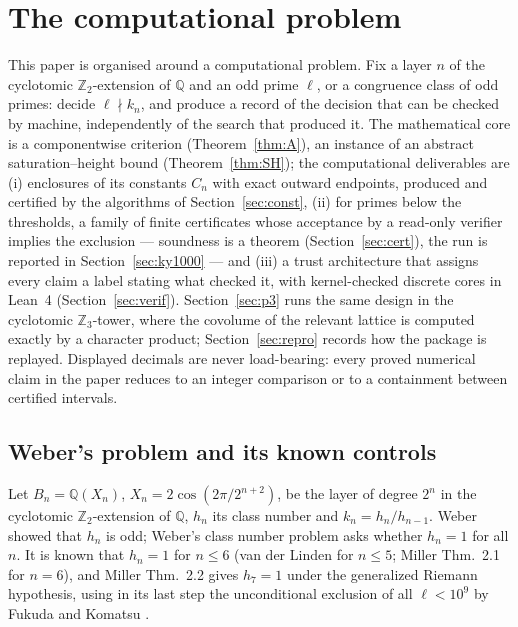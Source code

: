 \documentclass[11pt]{amsart}
\theoremstyle{remark}\newtheorem{remark}[theorem]{Remark}
\theoremstyle{definition}\newtheorem{definition}[theorem]{Definition}
\theoremstyle{definition}\newtheorem{algorithm}[theorem]{Algorithm}
\newcommand{\Q}{\mathbb{Q}}\newcommand{\Z}{\mathbb{Z}}\newcommand{\R}{\mathbb{R}}\newcommand{\F}{\mathbb{F}}
\begin{document}
\section{The computational problem}\label{sec:intro}
This paper is organised around a computational problem. Fix a layer $n$ of the cyclotomic $\Z_2$-extension of $\Q$ and an odd prime $\ell$, or a congruence class of odd primes: decide $\ell\nmid k_n$, and produce a record of the decision that can be checked by machine, independently of the search that produced it. The mathematical core is a componentwise criterion (Theorem~\ref{thm:A}), an instance of an abstract saturation--height bound (Theorem~\ref{thm:SH}); the computational deliverables are (i) enclosures of its constants $C_n$ with exact outward endpoints, produced and certified by the algorithms of Section~\ref{sec:const}, (ii) for primes below the thresholds, a family of finite certificates whose acceptance by a read-only verifier implies the exclusion --- soundness is a theorem (Section~\ref{sec:cert}), the run is reported in Section~\ref{sec:ky1000} --- and (iii) a trust architecture that assigns every claim a label stating what checked it, with kernel-checked discrete cores in Lean~4 (Section~\ref{sec:verif}). Section~\ref{sec:p3} runs the same design in the cyclotomic $\Z_3$-tower, where the covolume of the relevant lattice is computed exactly by a character product; Section~\ref{sec:repro} records how the package is replayed. Displayed decimals are never load-bearing: every proved numerical claim in the paper reduces to an integer comparison or to a containment between certified intervals.
\subsection{Weber's problem and its known controls}
Let $B_n=\Q(X_n)$, $X_n=2\cos(2\pi/2^{n+2})$, be the layer of degree $2^n$ in the cyclotomic $\Z_2$-extension of $\Q$, $h_n$ its class number and $k_n=h_n/h_{n-1}$. Weber showed that $h_n$ is odd; Weber's class number problem asks whether $h_n=1$ for all $n$. It is known that $h_n=1$ for $n\le6$ (van der Linden for $n\le5$; Miller \cite{Mi} Thm.~2.1 for $n=6$), and Miller \cite{Mi} Thm.~2.2 gives $h_7=1$ under the generalized Riemann hypothesis, using in its last step the unconditional exclusion of all $\ell<10^9$ by Fukuda and Komatsu \cite{FK3}.
\end{document}
